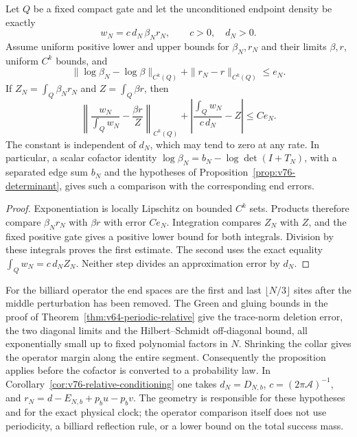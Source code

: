 \begin{corollary}
\label{cor:v76-relative-conditioning}
Let $Q$ be a fixed compact gate and let the unconditioned endpoint
density be exactly
\[
 w_N=c\,d_N\,\beta_N r_N,\qquad c>0,\quad d_N>0.
\]
Assume uniform positive lower and upper bounds for $\beta_N,r_N$ and
their limits $\beta,r$, uniform $C^k$ bounds, and
\[
 \|\log\beta_N-\log\beta\|_{C^k(Q)}
       +\|r_N-r\|_{C^k(Q)}\le e_N.
\]
If $Z_N=\int_Q\beta_Nr_N$ and $Z=\int_Q\beta r$, then
\begin{equation}\label{eq:v76-relative-conditioning}
 \left\|\frac{w_N}{\int_Qw_N}-\frac{\beta r}{Z}\right\|_{C^k(Q)}
 +\left|\frac{\int_Qw_N}{c\,d_N}-Z\right|\le C e_N.
\end{equation}
The constant is independent of $d_N$, which may tend to zero at any
rate.  In particular, a scalar cofactor identity
$\log\beta_N=b_N-\log\det(I+T_N)$, with a separated edge sum
$b_N$ and the hypotheses of Proposition~\ref{prop:v76-determinant},
gives such a comparison with the corresponding end errors.
\end{corollary}
\begin{proof}
Exponentiation is locally Lipschitz on bounded $C^k$ sets.  Products
therefore compare $\beta_Nr_N$ with $\beta r$ with error $Ce_N$.
Integration compares $Z_N$ with $Z$, and the fixed positive gate gives
a positive lower bound for both integrals.  Division by these integrals
proves the first estimate.  The second uses the exact equality
$\int_Qw_N=c\,d_NZ_N$.  Neither step divides an approximation error
by $d_N$.
\end{proof}

For the billiard operator the end spaces are the first and last
$\lfloor N/3\rfloor$ sites after the middle perturbation has been
removed.  The Green and gluing bounds in the proof of
Theorem~\ref{thm:v64-periodic-relative} give the trace-norm deletion
error, the two diagonal limits and the Hilbert--Schmidt off-diagonal
bound, all exponentially small up to fixed polynomial factors in $N$.
Shrinking the collar gives the operator margin along the entire segment.
Consequently the proposition applies before the cofactor is converted
to a probability law.  In Corollary~\ref{cor:v76-relative-conditioning}
one takes $d_N=D_{N,b}$, $c=(2\pi\mathcal A)^{-1}$, and
$r_N=d-E_{N,b}+p_bu-p_bv$.  The geometry is responsible for these
hypotheses and for the exact physical clock; the operator comparison
itself does not use periodicity, a billiard reflection rule, or a lower
bound on the total success mass.
